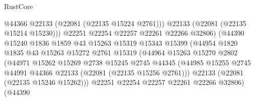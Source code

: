 \begin{lexlean}{RustCore}
\begin{coremodule}
                                        @44366
                                        @22133
                                        (@22081 (@22135 @15224 @2761)))
                                      @22133
                                      (@22081 (@22135 @15214 @15230)))
                                    @22251
                                    @22254
                                    @22257
                                    @22261
                                    @22266
                                    @32806)
                                  (@44390
                                    @15240
                                    @1836
                                    @1859
                                    @43
                                    @15263
                                    @15319
                                    @15343
                                    @15399
                                    (@44954
                                      @1820
                                      @1835
                                      @43
                                      @15263
                                      @15272
                                      @2761
                                      @15319
                                      (@44964
                                        @15263
                                        @15270
                                        @2802
                                        (@44971
                                          @15262
                                          @15269
                                          @2738
                                          @15245
                                          @2745
                                          @44345
                                          (@44985
                                            @15255
                                            @2745
                                            @44991
                                            @44366
                                            @22133
                                            (@22081 (@22135 @15256 @2761)))
                                          @22133
                                          (@22081 (@22135 @15246 @15262)))
                                        @22251
                                        @22254
                                        @22257
                                        @22261
                                        @22266
                                        @32806)
                                      (@44390

\end{coremodule}
\end{lexlean}
